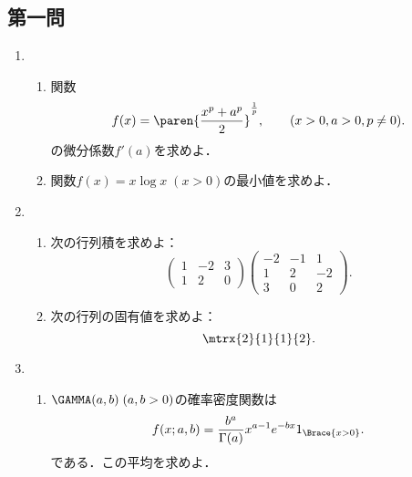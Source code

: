 \documentclass[uplatex,dvipdfmx]{jsarticle}
\begin{document}
\subsection{第一問}

\begin{tcolorbox}[colframe=ForestGreen, colback=ForestGreen!10!white,breakable,colbacktitle=ForestGreen!40!white,coltitle=black,fonttitle=\bfseries\sffamily,
    title=第１問]
    \begin{problem}\mbox{}
        \begin{enumerate}[{問}1]
            \item \begin{enumerate}[(1)]
                \item 関数
                \[f(x)=\paren{\frac{x^p+a^p}{2}}^{\frac{1}{p}},\qquad(x>0,a>0,p\ne0).\]
                の微分係数$f'(a)$を求めよ．
                \item 関数$f(x)=x\log x\;(x>0)$の最小値を求めよ．
            \end{enumerate}
            \item \begin{enumerate}[(1)]
                \item 次の行列積を求めよ：
                \[\begin{pmatrix}1&-2&3\\1&2&0\end{pmatrix}\begin{pmatrix}-2&-1&1\\1&2&-2\\3&0&2\end{pmatrix}.\]
                \item 次の行列の固有値を求めよ：
                \[\mtrx{2}{1}{1}{2}.\]
            \end{enumerate}
            \item \begin{enumerate}[(1)]
                \item $\GAMMA(a,b)\;(a,b>0)$の確率密度関数は
                \[f(x;a,b)=\frac{b^a}{\Gamma(a)}x^{a-1}e^{-bx}1_{\Brace{x>0}}.\]
                である．この平均を求めよ．
            \end{enumerate}
        \end{enumerate}
    \end{problem}
\end{tcolorbox}
\end{document}
